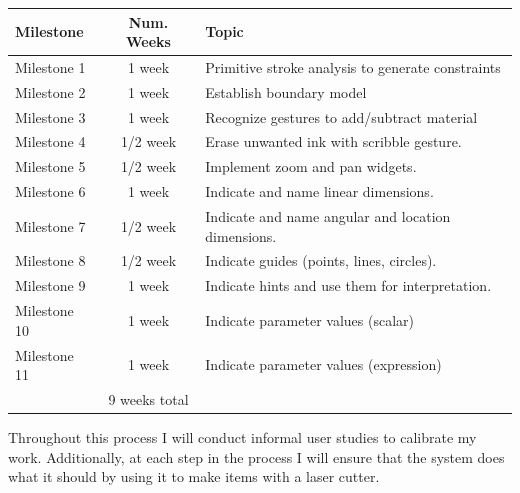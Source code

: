 \documentclass[11pt]{article}
\begin{document}
\vspace{12pt}
\begin{tabular}{ | l | c | l | }
  \hline

  \textbf{Milestone} & \textbf{Num. Weeks} & \textbf{Topic} \\

  \hline \hline

  Milestone 1 & 1 week & Primitive stroke analysis to generate constraints \\
  
  Milestone 2 & 1 week & Establish boundary model \\

  Milestone 3 & 1 week & Recognize gestures to add/subtract material \\

  Milestone 4 & 1/2 week & Erase unwanted ink with scribble gesture. \\

  Milestone 5 & 1/2 week & Implement zoom and pan widgets. \\ 

  Milestone 6 & 1 week & Indicate and name linear dimensions. \\

  Milestone 7 & 1/2 week & Indicate and name angular and location dimensions. \\

  Milestone 8 & 1/2 week & Indicate guides (points, lines, circles). \\ 

  Milestone 9 & 1 week & Indicate hints and use them for interpretation. \\ 

  Milestone 10 & 1 week & Indicate parameter values (scalar) \\ 

  Milestone 11 & 1 week & Indicate parameter values (expression) \\

  \hline
  
  & 9 weeks total & \\

  \hline

\end{tabular}
\vspace{12pt}

Throughout this process I will conduct informal user studies to
calibrate my work. Additionally, at each step in the process I will
ensure that the system does what it should by using it to make items
with a laser cutter. 
\end{document}
